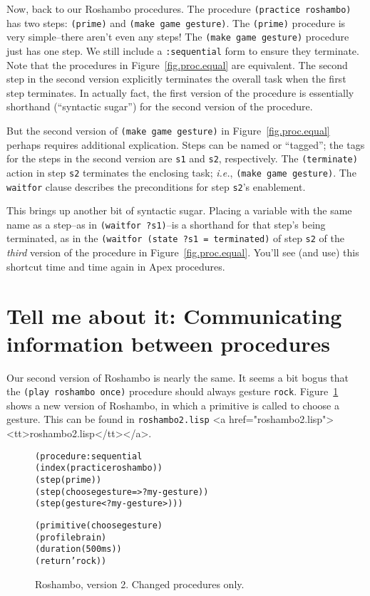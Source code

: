 \documentclass[12pt]{article}
\newcommand{\ic}{\texttt}
\newenvironment{code}%
   {\begin{alltt}}%
   {\end{alltt}}
\newenvironment{float}%
   {\begin{center}}%
   {\end{center}
   }
\newcommand{\fn}[1]{\texonly\texttt{#1}\endtexonly
  \htmlonly \rawhtml <a href="#1"><tt>#1</tt></a>\endrawhtml \endhtmlonly}
\begin{document}
Now, back to our Roshambo procedures. The procedure  \ic{(practice roshambo)} has two steps: \ic{(prime)} and \ic{(make game gesture)}. The  \ic{(prime)} procedure is very simple--there aren't even any steps! The \ic{(make game gesture)} procedure just has one step. We still include a \ic{:sequential} form to ensure they terminate. Note that the procedures in Figure~\ref{fig.proc.equal} are equivalent. The second step in the second version explicitly terminates the overall task when the first step terminates. In actually fact, the first version of the procedure is essentially shorthand (``syntactic sugar'') for the second version of the procedure.

But the second version of \ic{(make game gesture)} in Figure~\ref{fig.proc.equal} perhaps requires additional explication. Steps can be named or ``tagged''; the tags for the steps in the second version are \ic{s1} and \ic{s2}, respectively. The \ic{(terminate)} action in step \ic{s2} terminates the enclosing task; \textit{i.e.}, \ic{(make game gesture)}. The \ic{waitfor} clause describes the preconditions for step \ic{s2}'s enablement. 

This brings up another bit of syntactic sugar. Placing a variable with the same name as a step--as in \ic{(waitfor ?s1)}--is a shorthand for that step's being terminated, as in  the \ic{(waitfor (state ?s1 = terminated)} of step \ic{s2} of the \textit{third} version of the procedure in Figure~\ref{fig.proc.equal}. You'll see (and use) this shortcut time and time again in Apex procedures.

\htmlpagebreak
\section{Tell me about it: Communicating information between procedures}

Our second version of Roshambo is nearly the same. It seems a bit bogus that the \ic{(play roshambo once)} procedure should always gesture \ic{rock}. Figure~\ref{fig.roshambo.2} shows a new version of Roshambo, in which a primitive is called to choose a gesture. This can be found in \fn{roshambo2.lisp}.
\begin{figure}
\begin{float}
\begin{code}
(procedure :sequential 
  (index (practice roshambo))
  (step (prime))
  (step (choose gesture => ?my-gesture))
  (step (gesture <?my-gesture>)))

(primitive (choose gesture)
  (profile brain)
  (duration (500 ms))
  (return 'rock))
\end{code}
\end{float}
\caption{Roshambo, version 2. Changed procedures only.\label{fig.roshambo.2}}
\end{figure}
\end{document}
